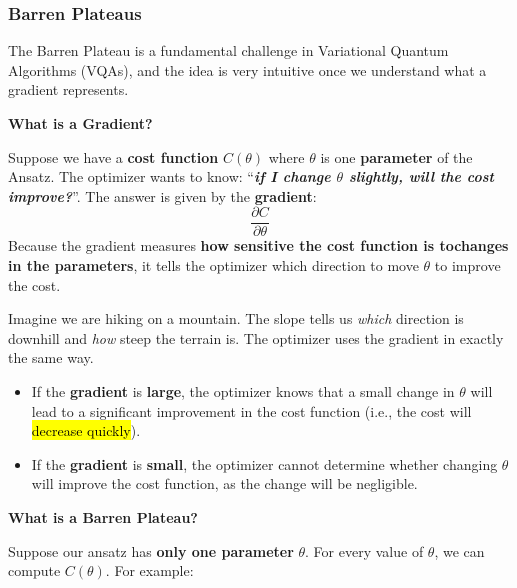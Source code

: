 \subsubsection{Barren Plateaus}\label{sec:barren-plateaus}

The Barren Plateau is a fundamental challenge in Variational Quantum Algorithms (VQAs), and the idea is very intuitive once we understand what a gradient represents.

\highspace
\begin{flushleft}
    \textcolor{Green3}{ \textbf{What is a Gradient?}}
\end{flushleft}
Suppose we have a \textbf{cost function} $C(\theta)$ where $\theta$ is one \textbf{parameter} of the Ansatz. The optimizer wants to know: ``\emph{\textbf{if I change $\theta$ slightly, will the cost improve?}}''. The answer is given by the \textbf{gradient}:
\begin{equation*}
    \frac{\partial C}{\partial \theta}
\end{equation*}
Because the gradient measures \textbf{how sensitive the cost function is to\break changes in the parameters}, it tells the optimizer which direction to move $\theta$ to improve the cost.

\highspace
\textcolor{Green3}{} Imagine we are hiking on a mountain. The slope tells us \emph{which} direction is downhill and \emph{how} steep the terrain is. The optimizer uses the gradient in exactly the same way.
\begin{itemize}
    \item If the \textbf{gradient} is \textbf{large}, the optimizer knows that a small change in $\theta$ will lead to a significant improvement in the cost function (i.e., the cost will \hl{decrease quickly}).
    \item If the \textbf{gradient} is \textbf{small}, the optimizer cannot determine whether changing $\theta$ will improve the cost function, as the change will be negligible.
\end{itemize}

\highspace
\begin{flushleft}
    \textcolor{Green3}{ \textbf{What is a Barren Plateau?}}
\end{flushleft}
Suppose our ansatz has \textbf{only one parameter} $\theta$. For every value of $\theta$, we can compute $C\left(\theta\right)$. For example:

